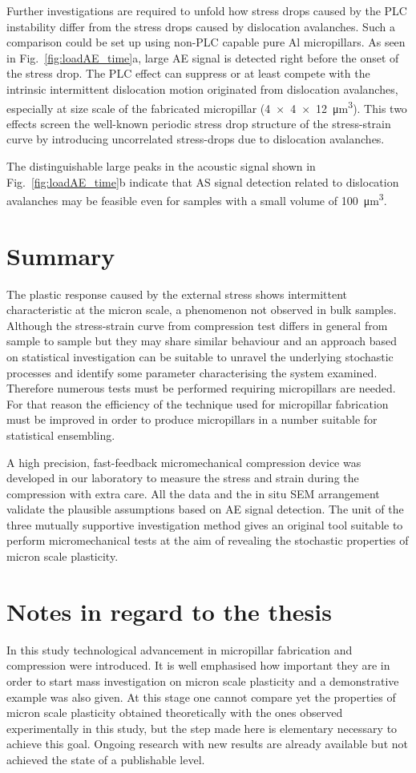 Further investigations are required to unfold how stress drops caused by the PLC instability differ from the stress drops caused by dislocation avalanches. Such a comparison could be set up using non-PLC capable pure Al micropillars. As seen in Fig.~\ref{fig:loadAE_time}a, large AE signal is detected right before the onset of the stress drop. The PLC effect can suppress or at least compete with the intrinsic intermittent dislocation motion originated from dislocation avalanches, especially at size scale of the fabricated micropillar (\SI{4x4x12}{\micro m^3}). This two effects screen the well-known periodic stress drop structure of the stress-strain curve by introducing uncorrelated stress-drops due to dislocation avalanches.

The distinguishable large peaks in the acoustic signal shown in Fig.~\ref{fig:loadAE_time}b indicate that AS signal detection related to dislocation avalanches may be feasible even for samples with a small volume of \SI{100}{\micro m^3}.

\section{Summary}
The plastic response caused by the external stress shows intermittent characteristic at the micron scale, a phenomenon not observed in bulk samples. Although the stress-strain curve from compression test differs in general from sample to sample but they may share similar behaviour and an approach based on statistical investigation can be suitable to unravel the underlying stochastic processes and identify some parameter characterising the system examined. Therefore numerous tests must be performed requiring micropillars are needed. For that reason the efficiency of the technique used for micropillar fabrication must be improved in order to produce micropillars in a number suitable for statistical ensembling.

A high precision, fast-feedback micromechanical compression device was developed in our laboratory to measure the stress and strain during the compression with extra care. All the data and the in situ SEM arrangement validate the plausible assumptions based on AE signal detection. The unit of the three mutually supportive investigation method gives an original tool suitable to perform micromechanical tests at the aim of revealing the stochastic properties of micron scale plasticity.

\section*{Notes in regard to the thesis}
In this study technological advancement in micropillar fabrication and compression were introduced. It is well emphasised how important they are in order to start mass investigation on micron scale plasticity and a demonstrative example was also given. At this stage one cannot compare yet the properties of micron scale plasticity obtained theoretically with the ones observed experimentally in this study, but the step made here is elementary necessary to achieve this goal. Ongoing research with new results are already available but not achieved the state of a publishable level.

